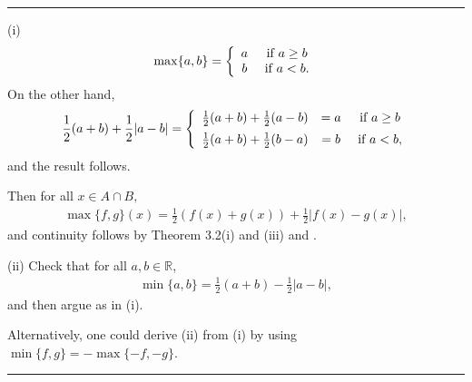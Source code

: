 \documentclass[letterpaper,10pt,english]{jupyterBook}
\begin{document}
\bigskip\hrule\bigskip


\sphinxAtStartPar
{\hyperref[\detokenize{Problems:id20}]{}} 
(i)
\begin{equation*}
\begin{split}
\max\{a, b\} = \left\{\begin{array}{c c} a & ~\mbox{if}~a \geq b\\
b & ~\mbox{if}~a < b.\\ \end{array} \right.
\end{split}
\end{equation*}
\sphinxAtStartPar
On the other hand,
\begin{equation*}
\begin{split}
\frac{1}{2}( a+b) + \frac{1}{2}|a-b| = \left\{\begin{array}{c c c} \frac{1}{2}(a+b) + \frac{1}{2}(a- b) & = a & ~\mbox{if}~a \geq b\\[.5em]
\frac{1}{2}(a+b) + \frac{1}{2}(b- a) &=  b & ~\mbox{if}~a < b,\\ \end{array} \right.
\end{split}
\end{equation*}
\sphinxAtStartPar
and the result follows.

\sphinxAtStartPar
Then for all \(x \in A\cap B,\)
\begin{equation*}
\begin{split}
\max\{f, g\}(x) = \frac{1}{2}(f(x) + g(x)) + \frac{1}{2}|f(x) - g(x)|,
\end{split}
\end{equation*}
\sphinxAtStartPar
and continuity follows by Theorem  3.2(i) and (iii) and {\hyperref[\detokenize{Problems:id14}]{}}.

\sphinxAtStartPar
(ii) Check that for all \(a, b \in \mathbb{R}\),
\begin{equation*}
\begin{split}
\min\{a, b\} = \frac{1}{2}(a + b) - \frac{1}{2}|a - b|,
\end{split}
\end{equation*}
\sphinxAtStartPar
and then argue as in (i).

\sphinxAtStartPar
Alternatively, one could derive (ii) from (i) by using \(\min\{f,g\} = - \max\{-f, -g\}\).


\bigskip\hrule\bigskip
\end{document}
